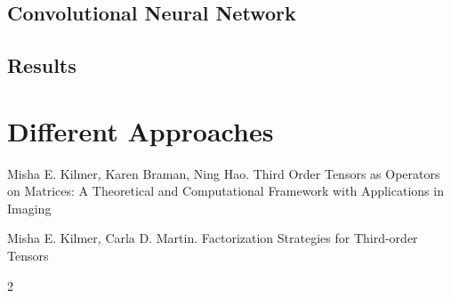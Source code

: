 \documentclass[twoside]{article}
\begin{document}
\begin{multicols}{2}
\subsection{Convolutional Neural Network}

\subsection{Results}

\section{Different Approaches}





\begin{thebibliography}{99}

Misha E. Kilmer, Karen Braman, Ning Hao.
\newblock Third Order Tensors as Operators on Matrices: A
Theoretical and Computational Framework with
Applications in Imaging

Misha E. Kilmer, Carla D. Martin.
\newblock Factorization Strategies for Third-order Tensors

 
\end{thebibliography}


\end{multicols}{2}
\end{document}
